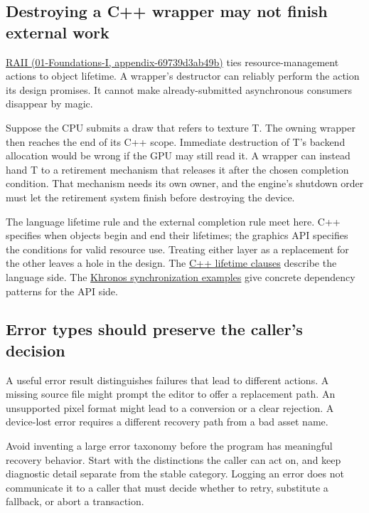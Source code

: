 \subsection{Destroying a C++ wrapper may not finish external work}\label{05-engine-i-ch008-destroying-a-c-wrapper-may-not-finish-external-work}

\href{../01-Foundations-I/main.pdf\#nameddest=appendix-69739d3ab49b}{RAII (01-Foundations-I, appendix-69739d3ab49b)} ties resource-management actions to object lifetime. A wrapper's destructor can reliably perform the action its design promises. It cannot make already-submitted asynchronous consumers disappear by magic.

Suppose the CPU submits a draw that refers to texture T. The owning wrapper then reaches the end of its C++ scope. Immediate destruction of T's backend allocation would be wrong if the GPU may still read it. A wrapper can instead hand T to a retirement mechanism that releases it after the chosen completion condition. That mechanism needs its own owner, and the engine's shutdown order must let the retirement system finish before destroying the device.

The language lifetime rule and the external completion rule meet here. C++ specifies when objects begin and end their lifetimes; the graphics API specifies the conditions for valid resource use. Treating either layer as a replacement for the other leaves a hole in the design. The \href{https://eel.is/c++draft/basic.life}{C++ lifetime clauses} describe the language side. The \href{https://docs.vulkan.org/guide/latest/synchronization_examples.html}{Khronos synchronization examples} give concrete dependency patterns for the API side.

\subsection{Error types should preserve the caller's decision}\label{05-engine-i-ch008-error-types-should-preserve-the-callers-decision}

A useful error result distinguishes failures that lead to different actions. A missing source file might prompt the editor to offer a replacement path. An unsupported pixel format might lead to a conversion or a clear rejection. A device-lost error requires a different recovery path from a bad asset name.

Avoid inventing a large error taxonomy before the program has meaningful recovery behavior. Start with the distinctions the caller can act on, and keep diagnostic detail separate from the stable category. Logging an error does not communicate it to a caller that must decide whether to retry, substitute a fallback, or abort a transaction.

